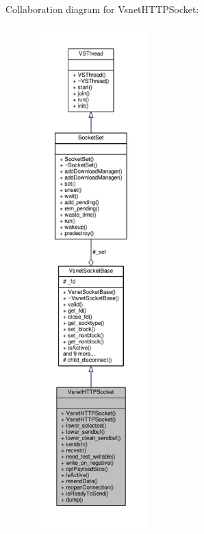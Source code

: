 Collaboration diagram for Vsnet\+H\+T\+T\+P\+Socket\+:
\nopagebreak
\begin{figure}[H]
\begin{center}
\leavevmode
\includegraphics[height=550pt]{dc/d94/classVsnetHTTPSocket__coll__graph}
\end{center}
\end{figure}
